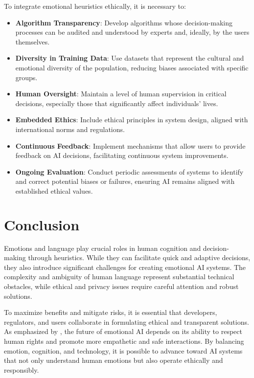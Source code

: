 \documentclass[a4paper,12pt]{report}
\begin{document}
	To integrate emotional heuristics ethically, it is necessary to:
	
	\begin{itemize}
		\item \textbf{Algorithm Transparency}: Develop algorithms whose decision-making processes can be audited and understood by experts and, ideally, by the users themselves.
		\item \textbf{Diversity in Training Data}: Use datasets that represent the cultural and emotional diversity of the population, reducing biases associated with specific groups.
		\item \textbf{Human Oversight}: Maintain a level of human supervision in critical decisions, especially those that significantly affect individuals' lives.
		\item \textbf{Embedded Ethics}: Include ethical principles in system design, aligned with international norms and regulations.
		\item \textbf{Continuous Feedback}: Implement mechanisms that allow users to provide feedback on AI decisions, facilitating continuous system improvements.
		\item \textbf{Ongoing Evaluation}: Conduct periodic assessments of systems to identify and correct potential biases or failures, ensuring AI remains aligned with established ethical values.
	\end{itemize}
	
	\section{Conclusion}
	
	Emotions and language play crucial roles in human cognition and decision-making through heuristics. While they can facilitate quick and adaptive decisions, they also introduce significant challenges for creating emotional AI systems. The complexity and ambiguity of human language represent substantial technical obstacles, while ethical and privacy issues require careful attention and robust solutions.
	
	To maximize benefits and mitigate risks, it is essential that developers, regulators, and users collaborate in formulating ethical and transparent solutions. As emphasized by \textcite{russell2020}, the future of emotional AI depends on its ability to respect human rights and promote more empathetic and safe interactions. By balancing emotion, cognition, and technology, it is possible to advance toward AI systems that not only understand human emotions but also operate ethically and responsibly.
	
\end{document}
